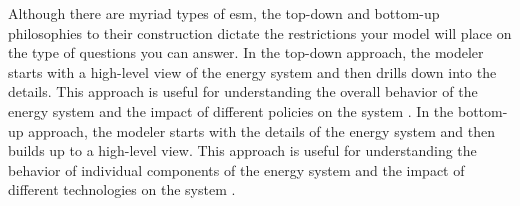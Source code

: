 Although there are myriad types of \gls{esm}, the top-down and bottom-up philosophies to their construction dictate the restrictions your model will place on the type of questions you can answer. In the top-down approach, the modeler starts with a high-level view of the energy system and then drills down into the details. This approach is useful for understanding the overall behavior of the energy system and the impact of different policies on the system \cite{laha_energy_2017}. In the bottom-up approach, the modeler starts with the details of the energy system and then builds up to a high-level view. This approach is useful for understanding the behavior of individual components of the energy system and the impact of different technologies on the system \cite{ipcc_ch2_2000,laha_energy_2017}.